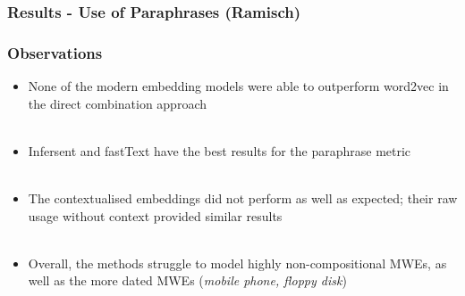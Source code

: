 \documentclass[english,svgnames,notes=hide,14pt,aspectratio=169]{beamer}
\begin{document}
\begin{frame}
\frametitle{Results - Use of Paraphrases (Ramisch)}
\begin{center}
\pgfplotsset{width=12cm,height=6cm}
\end{center}
\end{frame}


\begin{frame}
\frametitle{Observations}
\begin{itemize}
    \item None of the modern embedding models were able to outperform word2vec in the direct combination approach \\~\\
    \item Infersent and fastText have the best results for the paraphrase metric \\~\\
    \item The contextualised embeddings did not perform as well as expected; their raw usage without context provided similar results\\~\\
    \item Overall, the methods struggle to model highly non-compositional MWEs, as well as the more dated MWEs (\textit{mobile phone, floppy disk})
\end{itemize}
\end{frame}

\end{document}
